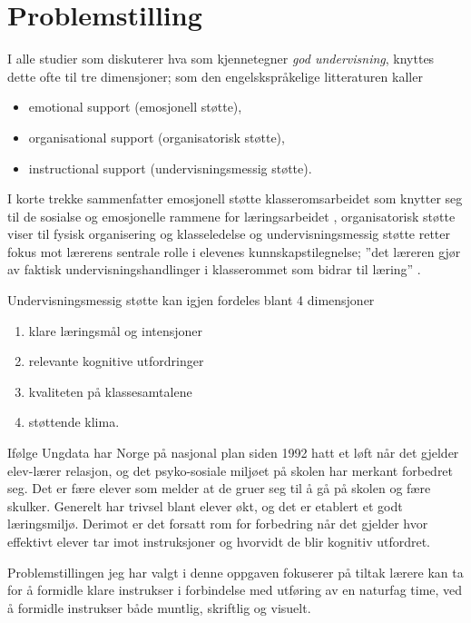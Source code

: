 \documentclass[main.tex]{subfiles}
\begin{document}
\section*{Problemstilling}    
I alle studier som diskuterer hva som kjennetegner \emph{god undervisning}, knyttes 
dette ofte til tre dimensjoner\cite[Klette 2013, side 142]{klette}; som den 
engelskspråkelige litteraturen kaller 
\begin{itemize}
\item emotional support (emosjonell støtte),
\item organisational support (organisatorisk støtte),
\item instructional support (undervisningsmessig støtte).
\end{itemize}
I korte trekke sammenfatter emosjonell støtte klasseromsarbeidet som knytter
seg til de sosialse og emosjonelle rammene for læringsarbeidet \cite[Klette 2013, side 143]{klette},
organisatorisk støtte viser til fysisk organisering og klasseledelse \cite[Klette 2013, side189]{klette}
og undervisningsmessig støtte retter fokus mot lærerens sentrale rolle i elevenes kunnskapstilegnelse; ''det 
læreren gjør av faktisk undervisningshandlinger i klasserommet som bidrar til læring'' 
\cite[Klette 2013, side 143 og 146]{klette}.
\newline

Undervisningsmessig støtte kan igjen fordeles blant 4 dimensjoner\cite[Klette 2013, side 146]{klette}
\begin{enumerate}
\item klare læringsmål og intensjoner
\item relevante kognitive utfordringer
\item kvaliteten på klassesamtalene
\item støttende klima.
\end{enumerate}

Ifølge Ungdata\cite[legg til referanse ungdata]{ungdata}\cite[Klette, side 144]{klette} har Norge på nasjonal 
plan siden 1992 hatt et løft når det gjelder elev-lærer 
relasjon, og det psyko-sosiale miljøet på skolen har merkant 
forbedret seg. Det er fære elever som melder at de gruer seg til å 
gå på skolen og fære skulker. Generelt har trivsel 
blant elever økt, og det er etablert et godt læringsmiljø. Derimot er det 
forsatt rom for forbedring når det gjelder hvor effektivt elever tar imot 
instruksjoner og hvorvidt de blir kognitiv utfordret. 
\newline

Problemstillingen jeg har valgt i denne oppgaven fokuserer på tiltak lærere kan ta for å
formidle klare instrukser i forbindelse med utføring av en naturfag time, ved å formidle instrukser 
både muntlig, skriftlig og visuelt.
\newline
\end{document}
